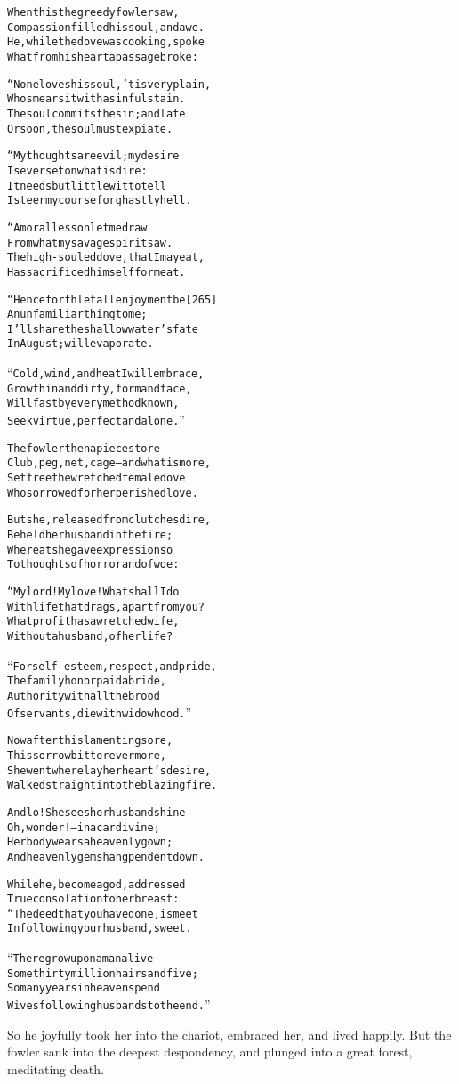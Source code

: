 \documentclass{article}
\renewenvironment{verbatim}{\begin{alltt}\normalfont\begin{centering}}{\end{centering}\end{alltt}}
\begin{document}
\begin{verbatim}
When this the greedy fowler saw,
Compassion filled his soul, and awe.
He, while the dove was cooking, spoke
What from his heart a passage broke:

“None loves his soul, 'tis very plain,
Who smears it with a sinful stain.
The soul commits the sin; and late
Or soon, the soul must expiate.

“My thoughts are evil; my desire
Is ever set on what is dire:
It needs but little wit to tell
I steer my course for ghastly hell.

“A moral lesson let me draw
From what my savage spirit saw.
The high-souled dove, that I may eat,
Has sacrificed himself for meat.

“Henceforth let all enjoyment be                        [265]
An unfamiliar thing to me;
I'll share the shallow water's fate
In August; will evaporate.

“Cold, wind, and heat I will embrace,
Grow thin and dirty, form and face,
Will fast by every method known,
Seek virtue, perfect and alone.”

The fowler then apieces tore
Club, peg, net, cage--and what is more,
Set free the wretched female dove
Who sorrowed for her perished love.

But she, released from clutches dire,
Beheld her husband in the fire;
Whereat she gave expression so
To thoughts of horror and of woe:

“My lord! My love! What shall I do
With life that drags, apart from you?
What profit has a wretched wife,
Without a husband, of her life?

“For self-esteem, respect, and pride,
The family honor paid a bride,
Authority with all the brood
Of servants, die with widowhood.”

Now after this lamenting sore,
This sorrow bitter evermore,
She went where lay her heart's desire,
Walked straight into the blazing fire.

And lo! She sees her husband shine--
Oh, wonder!--in a car divine;
Her body wears a heavenly gown;
And heavenly gems hang pendent down.

While he, become a god, addressed
True consolation to her breast:
“The deed that you have done, is meet
In following your husband, sweet.

“There grow upon a man alive
Some thirty million hairs and five;
So many years in heaven spend
Wives following husbands to the end.”
\end{verbatim}
So he joyfully took her into the chariot, embraced her, and lived
happily. But the fowler sank into the deepest despondency, and
plunged into a great forest, meditating death.
\end{document}
